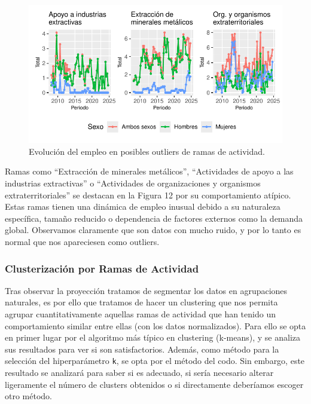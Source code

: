\documentclass[Universitat de
València,article,submit,moreauthors,pdftex]{Definitions/mdpi}
\begin{document}
\begin{figure}

{\centering \includegraphics{ProyectoAED2024_files/figure-latex/unnamed-chunk-43-1} 

}

\caption{Evolución del empleo en posibles outliers de ramas de actividad.}\label{fig:unnamed-chunk-43}
\end{figure}

Ramas como ``Extracción de minerales metálicos'', ``Actividades de apoyo
a las industrias extractivas'' o ``Actividades de organizaciones y
organismos extraterritoriales'' se destacan en la Figura 12 por su
comportamiento atípico. Estas ramas tienen una dinámica de empleo
inusual debido a su naturaleza específica, tamaño reducido o dependencia
de factores externos como la demanda global. Observamos claramente que
son datos con mucho ruido, y por lo tanto es normal que nos apareciesen
como outliers.

\subsubsection{\texorpdfstring{\textbf{Clusterización por Ramas de
Actividad}}{Clusterización por Ramas de Actividad}}\label{clusterizaciuxf3n-por-ramas-de-actividad}

Tras observar la proyección tratamos de segmentar los datos en
agrupaciones naturales, es por ello que tratamos de hacer un clustering
que nos permita agrupar cuantitativamente aquellas ramas de actividad
que han tenido un comportamiento similar entre ellas (con los datos
normalizados). Para ello se opta en primer lugar por el algoritmo más
típico en clustering (k-means), y se analiza sus resultados para ver si
son satisfactorios. Además, como método para la selección del
hiperparámetro \texttt{k}, se opta por el método del codo. Sin embargo,
este resultado se analizará para saber si es adecuado, si sería
necesario alterar ligeramente el número de clusters obtenidos o si
directamente deberíamos escoger otro método.
\end{document}
